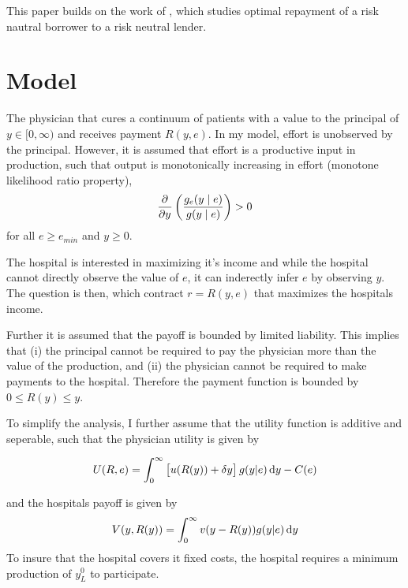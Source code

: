 This paper builds on the work of \textcite{Innes1990Limited}, which studies optimal repayment of a risk nautral borrower to a risk neutral lender.

\section{Model} %
\label{sec:model}
The physician that cures a continuum of patients with a value to the principal of $y\in[0,\infty)$ and receives payment $R(y,e)$.  In my model, effort is unobserved by the principal. However, it is assumed that effort is a productive input in production, such that output is monotonically increasing in effort (monotone likelihood ratio property),
\begin{align}
    \pder{y}\left(\frac{g_e(y\mid e)}{g(y\mid e)}\right)>0 \label{eq:mlrp}
\end{align}
for all $e\geq e_{min}$ and $y\geq 0$. 

The hospital is interested in maximizing it's income and while the hospital cannot directly observe the value of $e$, it can inderectly infer $e$ by observing $y$. The question is then, which contract $r=R(y,e)$ that maximizes the hospitals income.  

Further it is assumed that the payoff is bounded by limited liability. This implies that (i) the principal cannot be required to pay the physician more than the value of the production, and (ii) the physician cannot be required to make payments to the hospital.  Therefore the payment function is bounded by $0\leq R(y)\leq y$.

To simplify the analysis, I further assume that the utility function is additive and seperable, such that the physician utility is given by 

\begin{align}
    U(R,e)=\int_0^\infty \left[u(R(y))+\delta y\right]g(y|e)\dif y-C(e) \label{eq:utility}
\end{align}

and the hospitals payoff is given by 
\begin{align}
    V(y,R(y))=\int_0^\infty v(y-R(y))g(y|e)\dif y
\end{align}
To insure that the hospital covers it fixed costs, the hospital requires a minimum production of $y_L^0$ to participate. 

